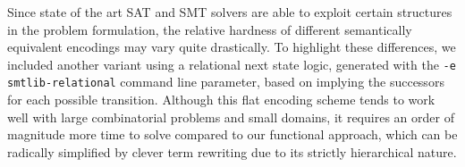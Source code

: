 Since state of the art SAT and SMT solvers are able to exploit certain structures in the problem formulation, the relative hardness of different semantically equivalent encodings may vary quite drastically.
To highlight these differences,
we included another variant using a relational next state logic,
generated with the \texttt{-e smtlib-relational} command line parameter, %
based on implying the successors for each possible transition.
Although this flat encoding scheme tends to work well with large combinatorial problems and small domains, it requires an order of magnitude more time to solve compared to our functional approach, which can be radically simplified by clever term rewriting due to its strictly hierarchical nature. %


